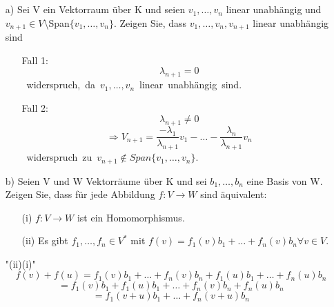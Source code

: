 \documentclass{article}
\begin{document}
    \section{}
    \begin{enumerate}

        \item[a)]Sei V ein Vektorraum über K und seien $v_1,\dots,v_n$ linear unabhängig und 
        $v_{n+1}\in V$\textbackslash Span$\{v_1,\dots,v_n\}$. Zeigen Sie, dass $v_1,\dots,v_n,v_{n+1}$ 
        linear unabhängig sind
        \begin{enumerate}
            \item[Fall 1:]
            \[\lambda_{n+1}=0\]
            \Rightarrow\ widerspruch,\ da\ $v_1,\dots,v_n$\ linear\ unabhängig\ sind.
            \item[Fall 2:]
            \[\lambda_{n+1}\neq0\]
            \[\Rightarrow V_{n+1}=\frac{-\lambda_1}{\lambda_{n+1}}v_1-\dots-\frac{\lambda_n}{\lambda_{n+1}}v_n\]
            \Rightarrow\ widerspruch\ zu\ $v_{n+1} \notin Span\{v_1,\dots,v_n\}$.
        \end{enumerate}

        \item[b)]Seien V und W Vektorräume über K und sei $b_1,\dots,b_n$ eine Basis von W. Zeigen Sie, 
        dass für jede Abbildung $f:V \rightarrow W$ sind äquivalent:
        \begin{enumerate}
            \item[(i)] $f:V \rightarrow W$ ist ein Homomorphismus.
            \item[(ii)]Es gibt $f_1,\dots,f_n \in V^*$ mit $f(v)=f_1(v)b_1+\dots+f_n(v)b_n \forall v \in V$.
        \end{enumerate}
        "(ii)\Rightarrow (i)"
        \newline
        \[f(v)+f(u)=f_1(v)b_1+\dots+f_n(v)b_n+f_1(u)b_1+\dots+f_n(u)b_n\]
        \[=f_1(v)b_1+f_1(u)b_1+\dots+f_n(v)b_n+f_n(u)b_n\]
        \[=f_1(v+u)b_1+\dots+f_n(v+u)b_n\]
    \end{enumerate}
\end{document}

